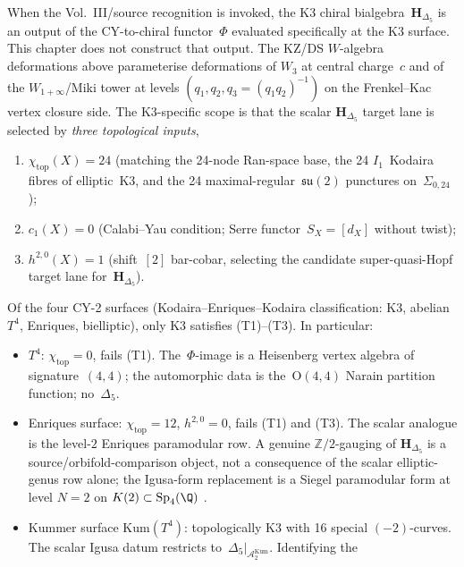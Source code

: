 \begin{remark}
\label{rem:wac-W15-1-scope}
When the Vol.~III/source recognition is invoked, the K3 chiral
bialgebra~$\mathbf{H}_{\Delta_5}$ is an output of the CY-to-chiral
functor~$\Phi$ evaluated specifically at the K3 surface. This chapter
does not construct that output. The KZ/DS $W$-algebra deformations above
parameterise
deformations of $W_3$ at central charge~$c$ and of the
$W_{1+\infty}$/Miki tower at levels $(q_1,q_2,q_3 = (q_1 q_2)^{-1})$
on the Frenkel--Kac vertex closure side. The K3-specific scope is
that the scalar $\mathbf{H}_{\Delta_5}$ target lane is selected by
\emph{three topological inputs},
\begin{enumerate}[label=\textup{(T\arabic*)},leftmargin=2em,
 topsep=0.3ex,itemsep=0.3ex]
\item $\chi_{\mathrm{top}}(X) = 24$ (matching the 24-node Ran-space
 base, the 24 $I_1$~Kodaira fibres of elliptic~K3, and the 24
 maximal-regular~$\mathfrak{su}(2)$ punctures on~$\Sigma_{0,24}$);
\item $c_1(X) = 0$ (Calabi--Yau condition; Serre functor~$S_X = [d_X]$
 without twist);
\item $h^{2,0}(X) = 1$ (shift~$[2]$ bar-cobar, selecting the candidate
 super-quasi-Hopf target lane for~$\mathbf{H}_{\Delta_5}$).
\end{enumerate}
Of the four CY-2 surfaces (Kodaira--Enriques--Kodaira classification:
K3, abelian $T^4$, Enriques, bielliptic), only K3 satisfies
(T1)--(T3). In particular:
\begin{itemize}
\item $T^4$: $\chi_{\mathrm{top}} = 0$, fails (T1). The~$\Phi$-image
 is a Heisenberg vertex algebra of signature~$(4,4)$; the automorphic
 data is the~$\mathrm{O}(4,4)$ Narain partition function; no~$\Delta_5$.
\item Enriques surface: $\chi_{\mathrm{top}} = 12$, $h^{2,0} = 0$,
 fails (T1) and (T3). The scalar analogue is the level-$2$ Enriques
 paramodular row. A genuine \(\mathbb Z/2\)-gauging of
 \(\mathbf{H}_{\Delta_5}\) is a source/orbifold-comparison object, not a
 consequence of the scalar elliptic-genus row alone; the Igusa-form
 replacement is a Siegel paramodular form at level $N = 2$
 on $K(2)\subset\mathrm{Sp}_4(\Q)$
 \cite{OguisoSakai2001,DolgachevKondo2002}.
\item Kummer surface $\mathrm{Kum}(T^4)$: topologically K3 with 16
 special $(-2)$-curves. The scalar Igusa datum restricts
 to~$\Delta_5|_{\mathcal{A}_2^{\mathrm{Kum}}}$. Identifying the

\end{itemize}
\end{remark}
